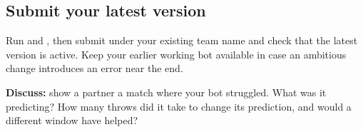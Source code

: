 \documentclass[11pt]{article}
\begin{document}
\subsection*{Submit your latest version}

Run  and , then submit under your existing team name and check that the latest version is active. Keep your earlier working bot available in case an ambitious change introduces an error near the end.


\begin{checkpoint}
\textbf{Discuss:} show a partner a match where your bot struggled. What was it predicting? How many throws did it take to change its prediction, and would a different window have helped?
\end{checkpoint}
\end{document}
